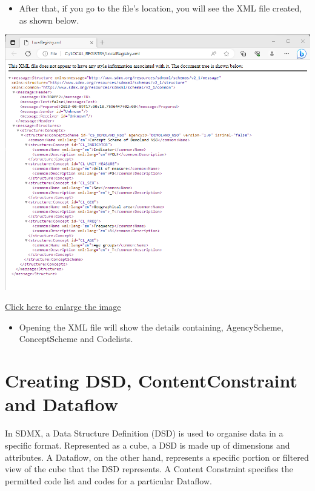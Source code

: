 \documentclass[
]{book}
\providecommand{\tightlist}{%
  \setlength{\itemsep}{0pt}\setlength{\parskip}{0pt}}
\begin{document}
\begin{itemize}
\tightlist
\item
  After that, if you go to the file's location, you will see the XML file created, as shown below.
\end{itemize}

\begin{center}\includegraphics[width=1\linewidth]{./images/image246} \end{center}

\href{images/image246.png}{Click here to enlarge the image}

\begin{itemize}
\tightlist
\item
  Opening the XML file will show the details containing, AgencyScheme, ConceptScheme and Codelists.
\end{itemize}

\hypertarget{creating-dsd}{%
\section{Creating DSD, ContentConstraint and Dataflow}\label{creating-dsd}}

In SDMX, a Data Structure Definition (DSD) is used to organise data in a specific format. Represented as a cube, a DSD is made up of dimensions and attributes. A Dataflow, on the other hand, represents a specific portion or filtered view of the cube that the DSD represents. A Content Constraint specifies the permitted code list and codes for a particular Dataflow.
\end{document}
